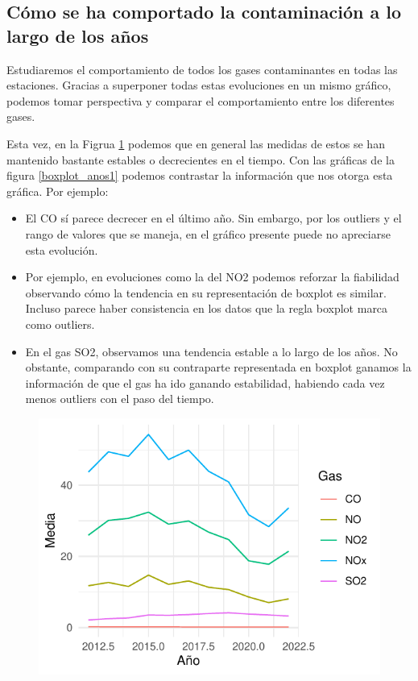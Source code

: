 \documentclass[notspecified,article,submit,moreauthors,pdftex]{Definitions/mdpi}
\providecommand{\tightlist}{%
  \setlength{\itemsep}{0pt}\setlength{\parskip}{0pt}}
\begin{document}
\hypertarget{cuxf3mo-se-ha-comportado-la-contaminaciuxf3n-a-lo-largo-de-los-auxf1os}{%
\subsection{Cómo se ha comportado la contaminación a lo largo de los
años}\label{cuxf3mo-se-ha-comportado-la-contaminaciuxf3n-a-lo-largo-de-los-auxf1os}}

Estudiaremos el comportamiento de todos los gases contaminantes en todas
las estaciones. Gracias a superponer todas estas evoluciones en un mismo
gráfico, podemos tomar perspectiva y comparar el comportamiento entre
los diferentes gases.

Esta vez, en la Figrua \ref{fig:pregunta5} podemos que en general las
medidas de estos se han mantenido bastante estables o decrecientes en el
tiempo. Con las gráficas de la figura \ref{boxplot_anos1} podemos
contrastar la información que nos otorga esta gráfica. Por ejemplo:

\begin{itemize}
\tightlist
\item
  El CO sí parece decrecer en el último año. Sin embargo, por los
  outliers y el rango de valores que se maneja, en el gráfico presente
  puede no apreciarse esta evolución.
\item
  Por ejemplo, en evoluciones como la del NO2 podemos reforzar la
  fiabilidad observando cómo la tendencia en su representación de
  boxplot es similar. Incluso parece haber consistencia en los datos que
  la regla boxplot marca como outliers.
\item
  En el gas SO2, observamos una tendencia estable a lo largo de los
  años. No obstante, comparando con su contraparte representada en
  boxplot ganamos la información de que el gas ha ido ganando
  estabilidad, habiendo cada vez menos outliers con el paso del tiempo.
\end{itemize}

\begin{figure}[H]

\includegraphics[width=0.7\linewidth]{ProyectoAED2023_files/figure-latex/pregunta5-1} \hfill{}

\caption{\label{fig:pregunta5}}\label{fig:pregunta5}
\end{figure}
\end{document}
